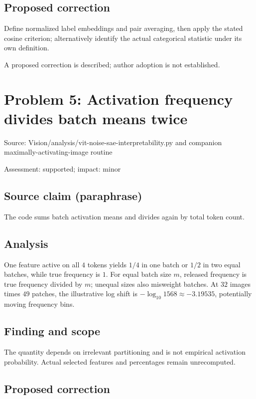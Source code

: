 \documentclass[11pt]{article}
\begin{document}
\subsection*{Proposed correction}

Define normalized label embeddings and pair averaging, then apply the stated cosine criterion; alternatively identify the actual categorical statistic under its own definition.

A proposed correction is described; author adoption is not established.

\section*{Problem 5: Activation frequency divides batch means twice}

Source: Vision/analysis/vit-noise-sae-interpretability.py and companion maximally-activating-image routine

Assessment: supported; impact: minor

\subsection*{Source claim (paraphrase)}

The code sums batch activation means and divides again by total token count.

\subsection*{Analysis}

One feature active on all \(4\) tokens yields \(1/4\) in one batch or \(1/2\) in two equal batches, while true frequency is \(1\). For equal batch size \(m\), released frequency is true frequency divided by \(m\); unequal sizes also misweight batches. At \(32\) images times \(49\) patches, the illustrative log shift is \(-\log_{10}1568\approx-3.19535\), potentially moving frequency bins.

\subsection*{Finding and scope}

The quantity depends on irrelevant partitioning and is not empirical activation probability. Actual selected features and percentages remain unrecomputed.

\subsection*{Proposed correction}
\end{document}
